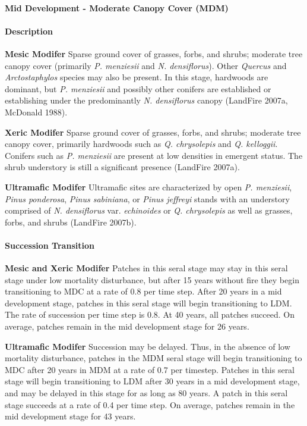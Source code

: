 \paragraph{Mid Development - Moderate Canopy Cover (MDM)}

\paragraph{Description}
\begin{adjustwidth}{2cm}{}
\textbf{Mesic Modifer } Sparse ground cover of grasses, forbs, and shrubs; moderate tree canopy cover (primarily \emph{P. menziesii} and \emph{ N. densiflorus}). Other \emph{Quercus} and \emph{Arctostaphylos} species may also be present. In this stage, hardwoods are dominant, but \emph{P. menziesii} and possibly other conifers are established or establishing under the predominantly \emph{N. densiflorus} canopy (LandFire 2007a, McDonald 1988). 


\medskip
\noindent \textbf{Xeric Modifer} Sparse ground cover of grasses, forbs, and shrubs; moderate tree canopy cover, primarily hardwoods such as \emph{Q. chrysolepis} and \emph{Q. kelloggii}. Conifers such as \emph{P. menziesii} are present at low densities in emergent status. The shrub understory is still a significant presence (LandFire 2007a). 


\medskip
\noindent \textbf{Ultramafic Modifer}  Ultramafic sites are characterized by open \emph{P. menziesii}, \emph{Pinus ponderosa}, \emph{Pinus sabiniana}, or \emph{Pinus jeffreyi} stands with an understory comprised of \emph{N. densiflorus} var. \emph{echinoides} or \emph{Q. chrysolepis} as well as grasses, forbs, and shrubs (LandFire 2007b).

\end{adjustwidth}
\paragraph{Succession Transition}
\begin{adjustwidth}{2cm}{}
\textbf{Mesic and Xeric Modifer } Patches in this seral stage may stay in this seral stage under low mortality disturbance, but after 15 years without fire they begin transitioning to MDC at a rate of 0.8 per time step. After 20 years in a mid development stage, patches in this seral stage will begin transitioning to LDM. The rate of succession per time step is 0.8. At 40 years, all patches succeed. On average, patches remain in the mid development stage for 26 years.


\medskip
\noindent \textbf{Ultramafic Modifer} Succession may be delayed. Thus, in the absence of low mortality disturbance, patches in the MDM seral stage will begin transitioning to MDC after 20 years in MDM at a rate of 0.7 per timestep. Patches in this seral stage will begin transitioning to LDM after 30 years in a mid development stage, and may be delayed in this stage for as long as 80 years. A patch in this seral stage succeeds at a rate of 0.4 per time step. On average, patches remain in the mid development stage for 43 years.

\end{adjustwidth}
